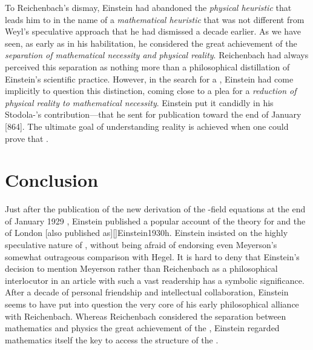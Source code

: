 \documentclass[final]{article}
\newcommand{\FP}{\german{Fernparallelismus}\xspace}
\begin{document}
To Reichenbach's dismay, Einstein had abandoned the \emph{physical heuristic} that leads him to \gr in the name of a \emph{mathematical heuristic} that was not different from Weyl's speculative approach that he had dismissed a decade earlier. As we have seen, as early as in his habilitation, he considered the great achievement of \rt the \emph{separation of mathematical necessity and physical reality}. Reichenbach had always perceived this separation as nothing more than a philosophical distillation of Einstein's scientific practice. However, in the search for a \uft, Einstein had come implicitly to question this distinction, coming close to a plea for a \emph{reduction of physical reality to mathematical necessity}. Einstein put it candidly in his Stodola-'s contribution---that he sent for publication toward the end of January [864]. The ultimate goal of understanding reality is achieved when one could prove that  \citep[127]{Einstein1929}.

\section{Conclusion}
%
Just after the publication of the new derivation of the \FP-field equations at the end of January 1929 \citep{Einstein1929b}, Einstein published a popular account of the theory for  and the  of London [also published as][]{Einstein1930h}. Einstein insisted on the highly speculative nature of \uftp, without being afraid of endorsing even Meyerson's somewhat outrageous comparison with Hegel. It is hard to deny that Einstein's decision to mention Meyerson rather than Reichenbach as a philosophical interlocutor in an article with such a vast readership has a symbolic significance. After a decade of personal friendship and intellectual collaboration, Einstein seems to have put into question the very core of his early philosophical alliance with Reichenbach. Whereas Reichenbach considered the separation between mathematics and physics the great achievement of the \rt, Einstein regarded mathematics itself the key to access the structure of the .
\end{document}
